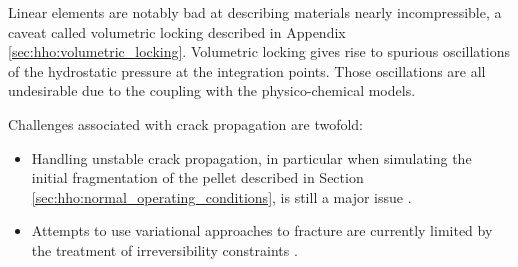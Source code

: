 
Linear elements are notably bad at describing materials nearly
incompressible, a caveat called volumetric locking described in Appendix
\ref{sec:hho:volumetric_locking}. Volumetric locking gives rise to spurious
oscillations of the hydrostatic pressure at the integration points.
Those oscillations are all undesirable due to the coupling with the
physico-chemical models.

Challenges associated with crack propagation are twofold:

\begin{itemize}
  \item Handling unstable crack propagation, in particular when simulating the
  initial fragmentation of the pellet described in Section
  \ref{sec:hho:normal_operating_conditions}, is still a major issue
  \cite{michel_new_2017, lu_schema_2019}.
  \item Attempts to use variational approaches to fracture are currently
  limited by the treatment of irreversibility constraints
  \cite{helfer_modelisation_2017, lu_schema_2019}.
\end{itemize}

